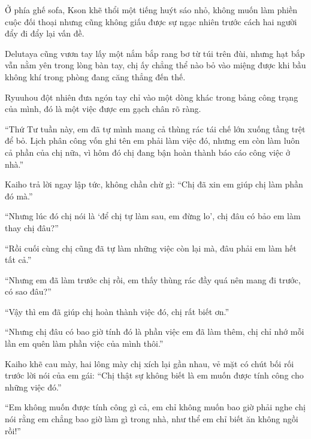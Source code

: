 \documentclass[../main.tex]{subfiles}
\begin{document}




Ở phía ghế sofa, Kson khẽ thổi một tiếng huýt sáo nhỏ, không muốn làm phiền cuộc đối thoại nhưng cũng không giấu được sự ngạc nhiên trước cách hai người đẩy đi đẩy lại vấn đề.

Delutaya cũng vươn tay lấy một nắm bắp rang bơ từ túi trên đùi, nhưng hạt bắp vẫn nằm yên trong lòng bàn tay, chị ấy chẳng thể nào bỏ vào miệng được khi bầu không khí trong phòng đang căng thẳng đến thế.

Ryuuhou đột nhiên đưa ngón tay chỉ vào một dòng khác trong bảng công trạng của mình, đó là một việc được em gạch chân rõ ràng.

``Thứ Tư tuần này, em đã tự mình mang cả thùng rác tái chế lớn xuống tầng trệt để bỏ. Lịch phân công vốn ghi tên em phải làm việc đó, nhưng em còn làm luôn cả phần của chị nữa, vì hôm đó chị đang bận hoàn thành báo cáo công việc ở nhà.''

Kaiho trả lời ngay lập tức, không chần chừ gì: ``Chị đã xin em giúp chị làm phần đó mà.''

``Nhưng lúc đó chị nói là `để chị tự làm sau, em đừng lo', chị đâu có bảo em làm thay chị đâu?''

``Rồi cuối cùng chị cũng đã tự làm những việc còn lại mà, đâu phải em làm hết tất cả.''

``Nhưng em đã làm trước chị rồi, em thấy thùng rác đầy quá nên mang đi trước, có sao đâu?''

``Vậy thì em đã giúp chị hoàn thành việc đó, chị rất biết ơn.''

``Nhưng chị đâu có bao giờ tính đó là phần việc em đã làm thêm, chị chỉ nhớ mỗi lần em quên làm phần việc của mình thôi.''

Kaiho khẽ cau mày, hai lông mày chị xích lại gần nhau, vẻ mặt có chút bối rối trước lời nói của em gái: ``Chị thật sự không biết là em muốn được tính công cho những việc đó.''

``Em không muốn được tính công gì cả, em chỉ không muốn bao giờ phải nghe chị nói rằng em chẳng bao giờ làm gì trong nhà, như thể em chỉ biết ăn không ngồi rồi!''
\end{document}
